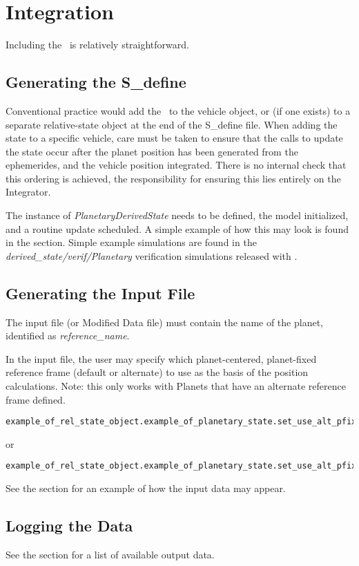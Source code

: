 %
%
% 
%

 \section{Integration}

Including the \PlanetaryDesc\ is relatively straightforward.

 \subsection{Generating the S\_define}

Conventional practice would add the \PlanetaryDesc\ to the vehicle object, or (if one exists) to a separate relative-state object at the end of the S\_define file.  When adding the state to a specific vehicle, care must be taken to ensure that the calls to update the state occur after the planet position has been generated from the ephemerides, and the vehicle position integrated.  There is no internal check that this ordering is achieved, the responsibility for ensuring this lies entirely on the Integrator.

The instance of \textit{PlanetaryDerivedState} needs to be defined, the model initialized, and a routine update scheduled.  A simple example of how this may look is found in the  section.  Simple example simulations are found in the 
\textit{derived\_state/verif/Planetary} verification simulations released with \JEODid.

\subsection{Generating the Input File}
The input file (or Modified Data file) must contain the name of the planet, identified as \textit{reference\_name}.

In the input file, the user may specify which planet-centered, planet-fixed reference frame (default or alternate) to use as the basis of the position calculations. Note: this only works with Planets that have an alternate reference frame defined.
\begin{verbatim}
example_of_rel_state_object.example_of_planetary_state.set_use_alt_pfix(False);

\end{verbatim}
or
\begin{verbatim}
example_of_rel_state_object.example_of_planetary_state.set_use_alt_pfix(True);

\end{verbatim}

See the  section for an example of how the input data may appear.

\subsection{Logging the Data}
See the  section for a list of available output data.
